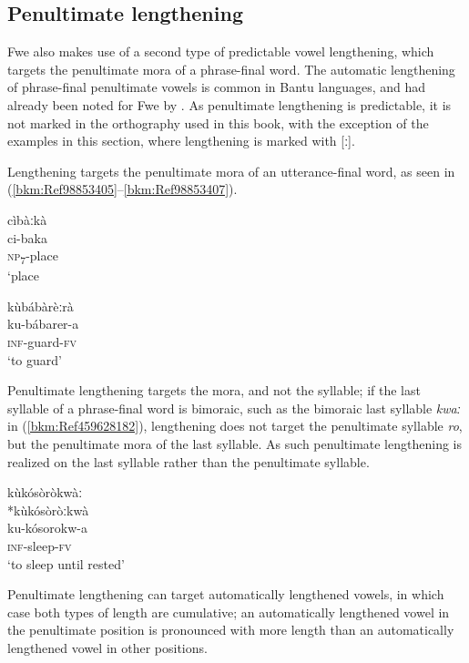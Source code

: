 \subsection{Penultimate lengthening}
\label{bkm:Ref451507715}\hypertarget{Toc75352607}{}
Fwe also makes use of a second type of predictable vowel lengthening, which targets the penultimate mora of a phrase-final word. The automatic lengthening of phrase-final penultimate vowels is common in Bantu languages, and had already been noted for Fwe by {\citet[111]{Bostoen2009}}. As penultimate lengthening is predictable, it is not marked in the orthography used in this book, with the exception of the exam\-ples in this section, where lengthening is marked with [ː].

Lengthening targets the penultimate mora of an utterance-final word, as seen in (\ref{bkm:Ref98853405}--\ref{bkm:Ref98853407}).

\ea
\label{bkm:Ref98853405}
\glll cìbàːkà\\
ci-baka\\
\textsc{np}\textsubscript{7}-place\\
\glt ‘place
\z

\ea
\label{bkm:Ref98853407}
\glll kùbábàrèːrà\\
ku-bábarer-a\\
\textsc{inf}-guard-\textsc{fv}\\
\glt ‘to guard’
\z

Penultimate lengthening targets the mora, and not the syllable; if the last syllable of a phrase-final word is bimoraic, such as the bimoraic last syllable \textit{kwaː} in (\ref{bkm:Ref459628182}), lengthening does not target the penultimate syllable \textit{ro}, but the penultimate mora of the last syllable. As such penultimate lengthening is realized on the last syllable rather than the penultimate syllable.

\ea
\label{bkm:Ref459628182}
kùkósòròkwàː\\
*kùkósòròːkwà\\
ku-kósorokw-a\\
\textsc{inf}-sleep-\textsc{fv}\\
\glt ‘to sleep until rested’
\z

\hspace*{-.3pt}Penultimate lengthening can target automatically lengthened vowels, in which case both types of length are cumulative; an automatically lengthened vowel in the penultimate position is pro\-nounced with more length than an automatically lengthened vowel in other positions.

